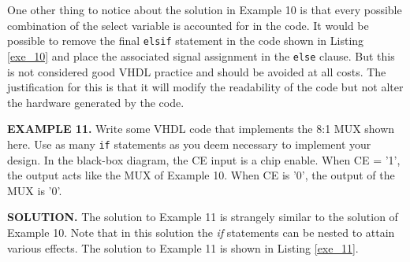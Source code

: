 One other thing to notice about the solution in Example 10 is that every possible combination of the select variable is accounted for in the code. It would be possible to remove the final \texttt{elsif} statement in the code shown in Listing \ref{exe_10} and place the associated signal assignment in the \texttt{else} clause. But this is not considered good VHDL practice and should be avoided at all costs. The justification for this is that it will modify the readability of the code but not alter the hardware generated by the code.

\begin{leftbar}
\noindent
\begin{minipage}{0.52\linewidth}
\textbf{EXAMPLE 11.}
Write some VHDL code that implements the 8:1 MUX shown here. Use as many \texttt{if} statements as you deem necessary to implement your design. In the black-box diagram, the CE input is a chip enable. When CE = '1', the output acts like the MUX of Example 10. When CE is '0', the output of the MUX is '0'.
\end{minipage}
\begin{minipage}{0.45\linewidth}
\begin{flushright}
\end{flushright}
\end{minipage}
\end{leftbar}
\noindent
\textbf{SOLUTION.} The solution to Example 11 is strangely similar to the solution of Example 10. Note that in this solution the \textit{if} statements can be nested to attain various effects. The solution to Example 11 is shown in Listing \ref{exe_11}.
